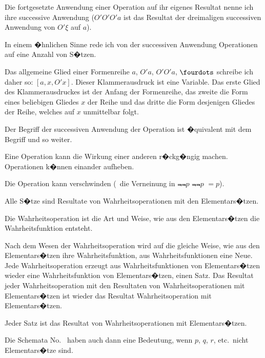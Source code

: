 \begin{propositions}
{Die fortgesetzte Anwendung einer Operation
\enlargethispage{2pt} %
auf ihr eigenes Resultat nenne ich ihre successive
Anwendung (\glqq{}$O' O' O' a$\grqq{} ist das Resultat der
dreimaligen successiven Anwendung von \glqq{}$O' \xi$\grqq{}
auf \glqq{}$a$\grqq{}).

In einem �hnlichen Sinne rede ich von der
successiven Anwendung  Operationen
auf eine Anzahl von S�tzen.}


{{\stretchyspace
Das allgemeine Glied einer Formenreihe $a$, $O' a$,
$O' O' a$, $\fourdots$ schreibe ich daher so: \glqq{}$[a, x, O' x]$\grqq{}.
Dieser Klammerausdruck ist eine Variable. Das
erste Glied des Klammerausdruckes ist der Anfang
der Formenreihe, das zweite die Form eines
beliebigen Gliedes $x$ der Reihe und das dritte
die Form desjenigen Gliedes der Reihe, welches
auf $x$ unmittelbar folgt.}}


{Der Begriff der successiven Anwendung der
Operation ist �quivalent mit dem Begriff \glqq{}und so
weiter\grqq{}.}


{Eine Operation kann die Wirkung einer anderen
r�ckg�ngig machen. Operationen k�nnen einander
aufheben.}


{\stretchyspace
{Die Operation kann verschwinden (\zumBeispiel\ die
Verneinung in \glqq{}$\Not{\Not{p}}$\grqq{}\DPtypo{}{,} $\Not{\Not{p}}$ $= p$).}}


{Alle S�tze sind Resultate von Wahrheitsoperationen
mit den Elementars�tzen.

Die Wahrheitsoperation ist die Art und Weise,
wie aus den Elementars�tzen die Wahrheitsfunktion
entsteht.

{\verystretchyspace
Nach dem Wesen der Wahrheitsoperation wird
auf die gleiche Weise, wie aus den Elementars�tzen
ihre Wahrheitsfunktion, aus Wahrheitsfunktionen
eine Neue. Jede Wahrheitsoperation erzeugt aus
Wahrheitsfunktionen von Elementars�tzen wieder
eine Wahrheitsfunktion von Elementars�tzen, einen
Satz. Das Resultat jeder Wahrheitsoperation mit
den Resultaten von Wahrheitsoperationen mit
Elementars�tzen ist wieder das Resultat 
Wahrheitsoperation mit Elementars�tzen.}

Jeder Satz ist das Resultat von Wahrheitsoperationen
mit Elementars�tzen.}


{Die Schemata No.~ haben auch dann eine
Bedeutung, wenn \glqq{}$p$\grqq{}, \glqq{}$q$\grqq{}, \glqq{}$r$\grqq{}, etc.\ nicht Elementars�tze
sind.

}
\end{propositions}

